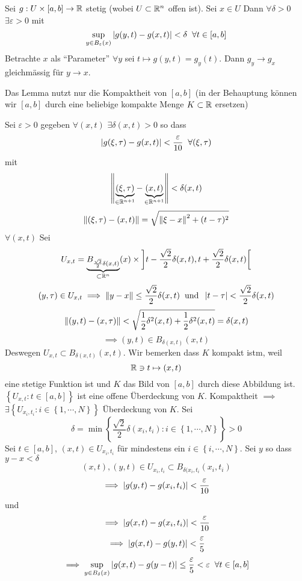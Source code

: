   \begin{Lem}
    Sei $g:U\times [a,b]\rightarrow\mathbb{R}$ stetig (wobei $U\subset\mathbb{R}^n$ offen ist). Sei $x\in U$ Dann $\forall \delta >0$ $\exists \varepsilon>0$ mit
    \[\sup_{y\in B_\varepsilon(x)}\left| g(y,t)-g(x,t) \right|<\delta\hspace{2mm}\forall t\in [a,b]\]
    Betrachte $x$ als ``Parameter'' $\forall y$ sei $t\mapsto g(y,t)=g_y(t)$. Dann $g_y\to g_x$ gleichmässig für $y\to x$.
 \end{Lem}
  \begin{Bem}
    Das Lemma nutzt nur die Kompaktheit von $[a,b]$ (in der Behauptung können wir $[a,b]$ durch eine beliebige kompakte Menge $K\subset\mathbb{R}$ ersetzen)
  \end{Bem}
  \begin{Bew}
    Sei $\varepsilon>0$ gegeben $\forall (x,t)$ $\exists \delta(x,t)>0$ so dass
    \[\left| g(\xi, \tau)-g(x,t) \right|<\frac{\varepsilon}{10}\hspace{2mm}\forall (\xi, \tau)\]
    mit
    \[\left\| \underbrace{(\xi,\tau)}_{\in \mathbb{R}^{n+1}}-\underbrace{(x,t)}_{\in \mathbb{R}^{n+1}} \right\|<\delta(x,t)\]
    \[\left\| (\xi,\tau)-(x,t) \right\|=\sqrt{\left\| \xi-x \right\|^2+(t-\tau)^2}\]
$\forall (x,t)$ Sei
  \[U_{x,t}=\underbrace{B_{\frac{\sqrt{2}}{2}\delta(x,t)}}_{\subset\mathbb{R}^n}(x)\times \left] t-\frac{\sqrt{2}}{2}\delta(x,t),t+\frac{\sqrt{2}}{2}\delta(x,t) \right[\]
\[(y,\tau)\in U_{x,t}\implies \left\| y-x \right\|\leq\frac{\sqrt{2}}{2}\delta(x,t)\hspace{2mm}\text{und}\hspace{2mm}\left| t-\tau \right|<\frac{\sqrt{2}}{2}\delta(x,t)\]
  \[\left\| (y,t)-(x,\tau) \right\|<\sqrt{\frac{1}{2}\delta^2(x,t)+\frac{1}{2}\delta^2(x,t)}=\delta(x,t)\]
  \[\implies (y,t)\in B_{\delta(x,t)}(x,t)\]
 Deswegen  $U_{x,t}\subset B_{\delta(x,t)}(x,t)$. Wir bemerken dass $K$ kompakt istm, weil
    \[\mathbb{R}\ni t\mapsto(x,t)\]
 eine stetige Funktion ist und $K$ das Bild von $[a,b]$ durch diese Abbildung ist.
  $\left\{ U_{x,t}:t\in [a,b] \right\}$ ist eine offene Überdeckung von $K$. Kompaktheit $\implies$ $\exists \left\{ U_{x_i,t_i}:i\in \left\{ 1,\cdots,N \right\} \right\}$ Überdeckung von $K$. Sei 
  \[\delta=\min\left\{ \frac{\sqrt{2}}{2}\delta(x_i,t_i):i\in\left\{ 1,\cdots,N \right\} \right\}>0\]
  Sei $t\in [a,b]$, $(x,t)\in U_{x_i,t_i}$ für mindestens ein $i\in \left\{ i,\cdots,N \right\}$. Sei $y$ so dass $y-x<\delta$
  \[(x,t),(y,t)\in U_{x_i,t_i}\subset B_{\delta(x_i,t_i}(x_i,t_i)\]
  \[\implies \left| g(y,t)-g(x_i,t_i) \right|<\frac{\varepsilon}{10}\]
  und
  \[\implies \left| g(x,t)-g(x_i,t_i) \right|<\frac{\varepsilon}{10}\]
  \[\implies \left| g(x,t)-g(y,t) \right|<\frac{\varepsilon}{5}\]
  \[\implies \sup_{y\in B_\delta(x)}\left| g(x,t)-g(y-t) \right|\leq\frac{\varepsilon}{5}<\varepsilon\hspace{2mm}\forall t\in [a,b]\]
\end{Bew}
